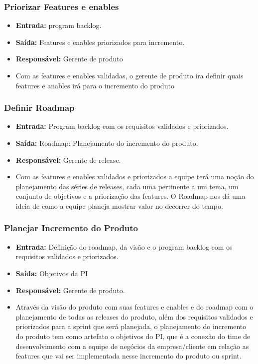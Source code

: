 \subsubsection{Priorizar Features e enables}
  \begin{itemize}
    \item \textbf{Entrada:} program backlog.
    \item \textbf{Saída:} Features e enables priorizados para incremento.
    \item \textbf{Responsável:} Gerente de produto
    \item Com as features e enables validadas, o gerente de produto ira definir quais features e anables irá para o incremento do produto
  \end{itemize}

\subsubsection{Definir Roadmap}
  \begin{itemize}
    \item \textbf{Entrada:} Program backlog com os requisitos validados e priorizados.
    \item \textbf{Saída:} Roadmap: Planejamento do incremento do produto.
    \item \textbf{Responsável:} Gerente de release.
    \item Com as features e enables validados e priorizados a equipe terá uma noção do planejamento das séries de releases, cada uma
      pertinente a um tema, um conjunto de objetivos e a priorização das features. O Roadmap nos dá uma ideia de como a equipe
      planeja mostrar valor no decorrer do tempo.
  \end{itemize}

\subsubsection{Planejar Incremento do Produto}
  \begin{itemize}
    \item \textbf{Entrada:} Definição do roadmap, da visão e o program backlog com os requisitos validados e priorizados.
    \item \textbf{Saída:} Objetivos da PI
    \item \textbf{Responsável:} Gerente de produto.
    \item Através da visão do produto com suas features e enables e do roadmap com o planejamento de todas as releases do produto,
      além dos requisitos validados e priorizados para a sprint que será planejada, o planejamento do incremento do produto tem como
      artefato o objetivos do PI, que é a conexão do time de desenvolvimento com a equipe de negócios da empresa/cliente em relação
      as features que vai ser implementada nesse incremento do produto ou sprint.
  \end{itemize}

